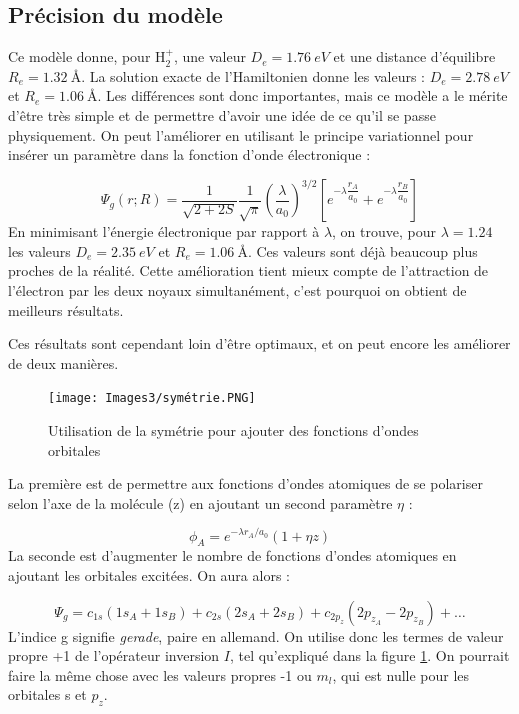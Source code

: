 \subsection{Précision du modèle}


Ce modèle donne, pour H$_2^+$, une valeur $D_e = \SI{1.76}{eV}$ et une distance d'équilibre $R_e = \SI{1.32}{\angstrom}$. La solution exacte de l'Hamiltonien donne les valeurs : $D_e = \SI{2.78}{eV}$ et $R_e=\SI{1.06}{\angstrom}$. Les différences sont donc importantes, mais ce modèle a le mérite d'être très simple et de permettre d'avoir une idée de ce qu'il se passe physiquement. On peut l'améliorer en utilisant le principe variationnel pour insérer un paramètre dans la fonction d'onde électronique :

\[
    \Psi_g(r;R) = \dfrac{1}{\sqrt{2+2S}}\dfrac{1}{\sqrt{\pi}}\left(\dfrac{\lambda}{a_0}\right)^{3/2}\left[e^{-\lambda\dfrac{r_A}{a_0}} + e^{-\lambda\dfrac{r_B}{a_0}}\right]
\]
En minimisant l'énergie électronique par rapport à $\lambda$, on trouve, pour $\lambda = 1.24$ les valeurs $D_e = \SI{2.35}{eV}$ et $R_e = \SI{1.06}{\angstrom}$. Ces valeurs sont déjà beaucoup plus proches de la réalité. Cette amélioration tient mieux compte de l'attraction de l'électron par les deux noyaux simultanément, c'est pourquoi on obtient de meilleurs résultats. 

Ces résultats sont cependant loin d'être optimaux, et on peut encore les améliorer de deux manières.
\begin{figure}[htpb]
    \centering
    \texttt{[image: Images3/symétrie.PNG]}
    \caption{Utilisation de la symétrie pour ajouter des fonctions d'ondes orbitales}
    \label{fig:sym}
\end{figure}
La première est de permettre aux fonctions d'ondes atomiques de se polariser selon l'axe de la molécule (z) en ajoutant un second paramètre $\eta$ :

\[ \phi_A = e^{-\lambda r_A/a_0}(1+\eta z) \]
La seconde est d'augmenter le nombre de fonctions d'ondes atomiques en ajoutant les orbitales excitées. On aura alors :

\[ \Psi_g = c_{1s}(1s_A+1s_B) + c_{2s}(2s_A+2s_B) + c_{2p_z}(2p_{z_A}-2p_{z_B}) + \dots \]
L'indice g signifie \textit{gerade}, paire en allemand. On utilise donc les termes de valeur propre +1 de l'opérateur inversion $I$, tel qu'expliqué dans la figure \ref{fig:sym}.
On pourrait faire la même chose avec les valeurs propres -1 ou $m_l$, qui est nulle pour les orbitales s et $p_z$.



